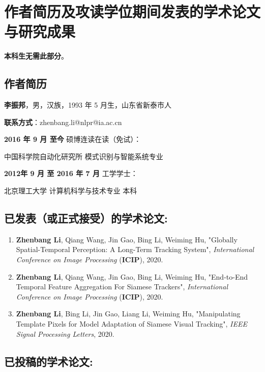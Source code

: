 \chapter{作者简历及攻读学位期间发表的学术论文与研究成果}

\textbf{本科生无需此部分}。

\section*{作者简历}

\textbf{李振邦}，男，汉族，1993 年 5 月生，山东省新泰市人

\textbf{联系方式}：zhenbang.li@nlpr@ia.ac.cn

\textbf{2016 年 9 月 至今} 硕博连读在读（免试）：

	中国科学院自动化研究所 模式识别与智能系统专业

\textbf{2012年 9 月 至 2016 年 7 月} 工学学士：

	北京理工大学 计算机科学与技术专业 本科


\section*{已发表（或正式接受）的学术论文:}

{
\setlist[enumerate]{}%
\begin{enumerate}[nosep]
    \item \textbf{Zhenbang Li}, Qiang Wang, Jin Gao,  Bing Li, Weiming Hu, "Globally Spatial-Temporal Perception: A Long-Term Tracking System", \textit{International Conference on Image Processing} (\textbf{ICIP}), 2020.
    \item \textbf{Zhenbang Li}, Qiang Wang, Jin Gao,  Bing Li, Weiming Hu, "End-to-End Temporal Feature Aggregation For Siamese Trackers", \textit{International Conference on Image Processing} (\textbf{ICIP}), 2020.
    \item \textbf{Zhenbang Li}, Bing Li, Jin Gao, Liang Li, Weiming Hu, "Manipulating Template Pixels for Model Adaptation of Siamese Visual Tracking", \textit{IEEE Signal Processing Letters}, 2020.
\end{enumerate}
}

\section*{已投稿的学术论文:}

